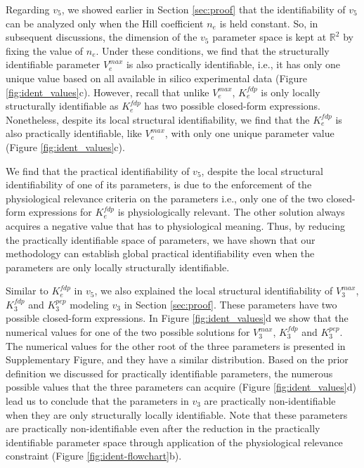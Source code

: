 \documentclass[10pt]{article}
\begin{document}
	Regarding $v_5$, we showed earlier in Section \ref{sec:proof} that the identifiability of $v_5$ can be analyzed only when the Hill coefficient $n_e$ is held constant. So, in subsequent discussions, the dimension of the $v_5$ parameter space is kept at $\mathbb{R}^2$ by fixing the value of $n_e$. Under these conditions, we find that the structurally identifiable parameter $V_e^{max}$ is also practically identifiable, i.e., it has only one unique value based on all available in silico experimental data (Figure \ref{fig:ident_values}c). However, recall that unlike $V_e^{max}$, $K_e^{fdp}$ is only locally structurally identifiable as $K_e^{fdp}$ has two possible closed-form expressions. Nonetheless, despite its local structural identifiability, we find that the $K_e^{fdp}$ is also practically identifiable, like $V_e^{max}$, with only one unique parameter value (Figure \ref{fig:ident_values}c).
	
	We find that the practical identifiability of $v_5$, despite the local structural identifiability of one of its parameters, is due to the enforcement of the physiological relevance criteria on the parameters i.e., only one of the two closed-form expressions for $K_e^{fdp}$ is physiologically relevant. The other solution always acquires a negative value that has to physiological meaning. Thus, by reducing the practically identifiable space of parameters, we have shown that our methodology can establish global practical identifiability even when the parameters are only locally structurally identifiable. 
	
	Similar to $K_e^{fdp}$ in $v_5$, we also explained the local structural identifiability of $V_3^{max}$, $K_3^{fdp}$ and $K_3^{pep}$ modeling $v_3$ in Section \ref{sec:proof}. These parameters have two possible closed-form expressions. In Figure \ref{fig:ident_values}d we show that the numerical values for one of the two possible solutions for $V_3^{max}$, $K_3^{fdp}$ and $K_3^{pep}$. The numerical values for the other root of the three parameters is presented in Supplementary Figure, and they have a similar distribution. Based on the prior definition we discussed for practically identifiable parameters, the numerous possible values that the three parameters can acquire (Figure \ref{fig:ident_values}d) lead us to conclude that the parameters in $v_3$ are practically non-identifiable when they are only structurally locally identifiable. Note that these parameters are practically non-identifiable even after the reduction in the practically identifiable parameter space through application of the physiological relevance constraint (Figure \ref{fig:ident-flowchart}b). 	
	
\end{document}
